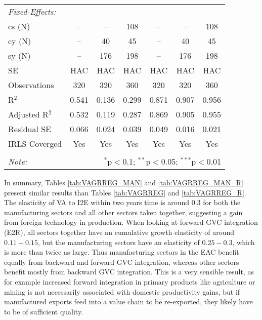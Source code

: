 \documentclass[a4paper]{article}
\begin{document}
\begin{table}[!htbp]
{\begin{tabular}[t]{lcccccc}
\midrule \emph{Fixed-Effects:} &   &   &   &   &   &  \\
cs (N) & -- & -- & 108 & -- & -- & 108\\
cy (N) & -- & 40 & 45 & -- & 40 & 45\\
sy (N) & -- & 176 & 198 & -- & 176 & 198\\ \midrule
SE & HAC & HAC & HAC &HAC &HAC &HAC \\
Observations & 320 & 320 & 360 & 320 & 320 & 360 \\ 
R$^{2}$ & 0.541 & 0.136 & 0.299 & 0.871 & 0.907 & 0.956 \\ 
Adjusted R$^{2}$ & 0.532 & 0.119 & 0.287 & 0.869 & 0.905 & 0.955 \\ 
Residual SE & 0.066 & 0.024 & 0.039 & 0.049 & 0.016 & 0.021 \\ 
IRLS Coverged & Yes & Yes & Yes & Yes & Yes & Yes \\
\bottomrule \\ [-1em]
\textit{Note:}  & \multicolumn{6}{r}{$^{*}$p$<$0.1; $^{**}$p$<$0.05; $^{***}$p$<$0.01} \\ 
\end{tabular} 
}
\end{table} 
\FloatBarrier



In summary, Tables \ref{tab:VAGRREG_MAN} and \ref{tab:VAGRREG_MAN_R} present similar results than Tables \ref{tab:VAGRREG} and \ref{tab:VAGRREG_R}. The elasticity  of VA to I2E within two years time is around $0.3$ for both the manufacturing sectors and all other sectors taken together, suggesting a gain from foreign technology in production. When looking at forward GVC integration (E2R), all sectors together have an cumulative growth elasticity of around $0.11-0.15$, but the manufacturing sectors have an elasticity of $0.25-0.3$, which is more than twice as large. Thus manufacturing sectors in the EAC benefit equally from backward and forward GVC integration, whereas other sectors benefit mostly from backward GVC integration. This is a very sensible result, as for example increased forward integration in primary products like agriculture or mining is not necessarily associated with domestic productivity gains, but if manufactured exports feed into a value chain to be re-exported, they likely have to be of sufficient quality.  
\end{document}
